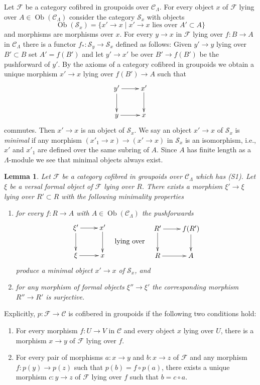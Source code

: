 \documentclass{amsart}
\theoremstyle{plain}
\newtheorem{lemma}[subsection]{Lemma}
\theoremstyle{definition}
\theoremstyle{remark}
\numberwithin{equation}{subsection}
\def\Ob{\mathop{\mathrm{Ob}}\nolimits}
\begin{document}
\medskip\noindent
Let $\mathcal{F}$ be a category cofibred in groupoids over
$\mathcal{C}_\Lambda$. For every object $x$ of $\mathcal{F}$
lying over $A \in \Ob(\mathcal{C}_\Lambda)$ consider the
category $\mathcal{S}_x$ with objects
$$
\Ob(\mathcal{S}_x) =
\{x' \to x \mid x' \to x\text{ lies over }A' \subset A\}
$$
and morphisms are morphisms over $x$. For every $y \to x$ in
$\mathcal{F}$ lying over $f : B \to A$
in $\mathcal{C}_\Lambda$ there is a functor
$f_* : \mathcal{S}_y \to \mathcal{S}_x$ defined as follows:
Given $y' \to y$ lying over $B' \subset B$ set $A' = f(B')$
and let $y' \to x'$ be over $B' \to f(B')$ be the pushforward of $y'$.
By the axioms of a category cofibred in groupoids we obtain a
unique morphism $x' \to x$ lying over $f(B') \to A$ such that
$$
\xymatrix{
y' \ar[d] \ar[r] & x' \ar[d] \\
y \ar[r] & x
}
$$
commutes. Then $x' \to x$ is an object of $\mathcal{S}_x$. We say an
object $x' \to x$ of $\mathcal{S}_x$ is {\it minimal} if any morphism
$(x'_1 \to x) \to (x' \to x)$ in $\mathcal{S}_x$ is an isomorphism, i.e.,
$x'$ and $x'_1$ are defined over the same subring of $A$. Since
$A$ has finite length as a $\Lambda$-module we see that minimal objects
always exist.



\begin{lemma}
\label{lemma-smallest-where-descends-versal}
Let $\mathcal{F}$ be a category cofibred in groupoids over
$\mathcal{C}_\Lambda$ which has (S1). Let $\xi$ be a versal formal object
of $\mathcal{F}$ lying over $R$. There exists a morphism $\xi' \to \xi$
lying over $R' \subset R$ with the following minimality properties
\begin{enumerate}
\item for every $f : R \to A$ with $A \in \Ob(\mathcal{C}_\Lambda)$
the pushforwards
$$
\vcenter{
\xymatrix{
\xi' \ar[d] \ar[r] & x' \ar[d] \\
\xi \ar[r] & x
}
}
\quad\text{lying over}\quad
\vcenter{
\xymatrix{
R' \ar[d] \ar[r] & f(R') \ar[d] \\
R \ar[r] & A
}
}
$$
produce a minimal object $x' \to x$ of $\mathcal{S}_x$, and
\item for any morphism of formal objects $\xi'' \to \xi'$
the corresponding morphism $R'' \to R'$ is surjective.
\end{enumerate}
\end{lemma}

\noindent
Explicitly, $p: \mathcal{F} \to \mathcal{C}$ is cofibered in groupoids if
the following two conditions hold:
\begin{enumerate}
\item For every morphism $f: U \to V$ in $\mathcal{C}$ and every object
$x$ lying over $U$, there is a morphism $x \to y$ of $\mathcal{F}$ lying
over $f$.
\item For every pair of morphisms $a: x \to y$ and $b: x \to z$
of $\mathcal{F}$ and any morphism $f: p(y) \to p(z)$ such that $p(b) = f
\circ p(a)$, there exists a unique morphism $c: y \to z$ of $\mathcal
F$ lying over $f$ such that $b = c \circ a$.
\end{enumerate}
\end{document}
